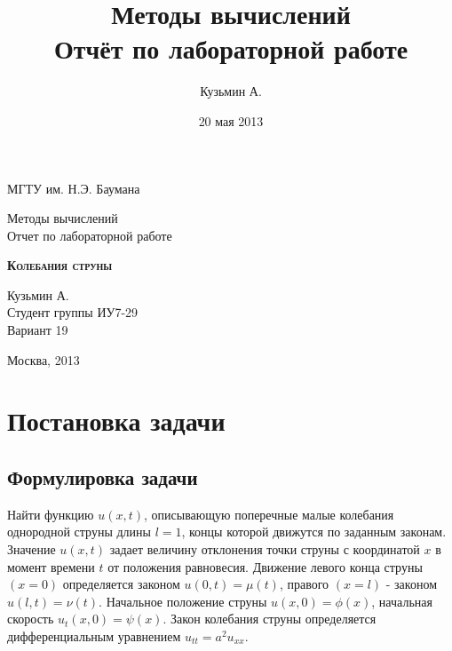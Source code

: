 \documentclass[a4paper,12pt]{article}
\title{ Методы вычислений \\Отчёт по лабораторной работе \textnumero 2 \\  }
\author{Кузьмин А.}
\date{20 мая 2013}
\begin{document}

\begin{titlepage}
\newpage
\begin{center}
МГТУ им. Н.Э. Баумана \\		%
\hrulefill %
\end{center}

\vspace{10em}
\begin{center}
\Large Методы вычислений \\
\vspace{1em}
Отчет по лабораторной работе  
\end{center}


\begin{center}
\textsc{\textbf{Колебания струны}}
\end{center}

\vspace{15em}
\begin{flushright}
Кузьмин А. \\
Студент группы ИУ7-29 \\
Вариант 19
\end{flushright}
\vspace{\fill}
\begin{center}
Москва, 2013
\end{center}
\end{titlepage}


\newpage

\section{Постановка задачи}
\subsection{Формулировка задачи}

Найти функцию $u(x,t)$, описывающую поперечные малые колебания однородной струны длины $l=1$, концы которой движутся по заданным законам. Значение  $u(x,t)$ задает величину отклонения точки струны с координатой $x$ в момент времени $t$ от положения равновесия. Движение левого конца струны $(x=0)$ определяется законом $u(0,t) = \mu(t)$, правого $(x=l)$ - законом  $u(l,t) = \nu(t)$. Начальное положение струны $u(x,0) = \phi(x)$, начальная скорость $u_t(x,0) = \psi(x)$. Закон колебания струны определяется дифференциальным уравнением $u_{tt} = a^2 u_{xx}$.
\end{document}
